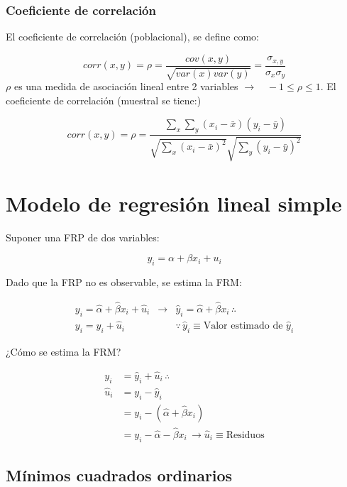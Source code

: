 \documentclass[
]{book}
\begin{document}
\hypertarget{coeficiente-de-correlaciuxf3n}{%
\subsection{Coeficiente de correlación}\label{coeficiente-de-correlaciuxf3n}}

El coeficiente de correlación (poblacional), se define como:

\[
corr(x,y) = \rho = \frac{cov(x,y)}{\sqrt{var(x)var(y)}} = \frac{\sigma_{x,y}}{\sigma_x \sigma_y}
\]
\(\rho\) es una medida de asociación lineal entre 2 variables \(\rightarrow \quad -1 \leq \rho \leq 1\).
El coeficiente de correlación (muestral se tiene:)

\[
corr(x,y) = \rho =  \frac{\sum_x \sum_y (x_i - \bar x)(y_i - \bar y)}{\sqrt{\sum_x (x_i - \bar x)^2} \sqrt{\sum_y(y_i - \bar y)^2}}
\]

\hypertarget{modelo-de-regresiuxf3n-lineal-simple}{%
\chapter{Modelo de regresión lineal simple}\label{modelo-de-regresiuxf3n-lineal-simple}}

Suponer una FRP de dos variables:

\[
y_i = \alpha + \beta x_i + u_i
\]

Dado que la FRP no es observable, se estima la FRM:

\[
\begin{array}{ccc}
y_i = \hat \alpha + \hat \beta x_i + \hat u_i & \rightarrow & \hat y_i = \hat \alpha + \hat \beta x_i \, \therefore \\
y_i = \hat y_i + \hat u_i & & \because \, \hat y_i \equiv \text{Valor estimado de } \hat y_i
\end{array}
\]

¿Cómo se estima la FRM?

\[
\begin{aligned}
y_i &= \hat y_i + \hat u_i \, \therefore \\
\hat u_i &= y_i - \hat y_i \\
&= y_i - (\hat \alpha + \hat \beta x_i) \\
&= y_i - \hat \alpha - \hat \beta x_i \, \rightarrow \hat u_i \equiv \text{Residuos}
\end{aligned}
\]

\hypertarget{muxednimos-cuadrados-ordinarios}{%
\section{Mínimos cuadrados ordinarios}\label{muxednimos-cuadrados-ordinarios}}
\end{document}
